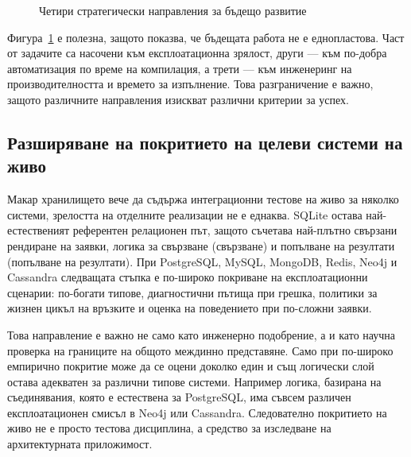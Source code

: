 \begin{figure}[H]
\centering
{}
\caption{Четири стратегически направления за бъдещо развитие}
\label{fig:future_work_axes}
\end{figure}

Фигура~\ref{fig:future_work_axes} е полезна, защото показва, че бъдещата работа не е еднопластова. Част от задачите са насочени към експлоатационна зрялост, други --- към по-добра автоматизация по време на компилация, а трети --- към инженеринг на производителността и времето за изпълнение. Това разграничение е важно, защото различните направления изискват различни критерии за успех.

\subsection{Разширяване на покритието на целеви системи на живо}

Макар хранилището вече да съдържа интеграционни тестове на живо за няколко системи, зрелостта на отделните реализации не е еднаква. SQLite остава най-естественият референтен релационен път, защото съчетава най-плътно свързани рендиране на заявки, логика за свързване (свързване) и попълване на резултати (попълване на резултати). При PostgreSQL, MySQL, MongoDB, Redis, Neo4j и Cassandra следващата стъпка е по-широко покриване на експлоатационни сценарии: по-богати типове, диагностични пътища при грешка, политики за жизнен цикъл на връзките и оценка на поведението при по-сложни заявки.

Това направление е важно не само като инженерно подобрение, а и като научна проверка на границите на общото междинно представяне. Само при по-широко емпирично покритие може да се оцени доколко един и същ логически слой остава адекватен за различни типове системи. Например логика, базирана на съединявания, която е естествена за PostgreSQL, има съвсем различен експлоатационен смисъл в Neo4j или Cassandra. Следователно покритието на живо не е просто тестова дисциплина, а средство за изследване на архитектурната приложимост.

